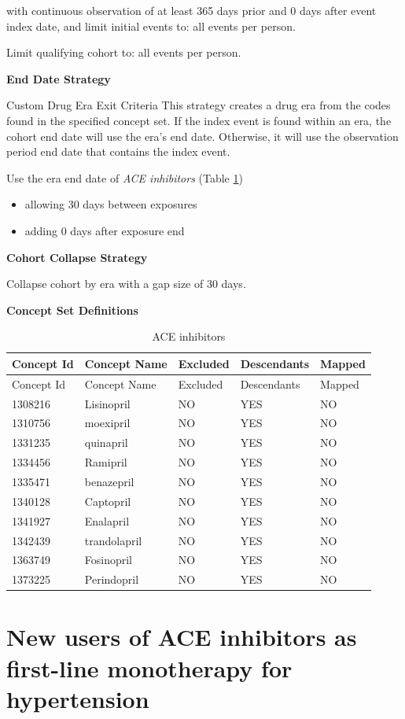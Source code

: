 \documentclass[]{book}
\providecommand{\tightlist}{%
  \setlength{\itemsep}{0pt}\setlength{\parskip}{0pt}}
\begin{document}
with continuous observation of at least 365 days prior and 0 days after
event index date, and limit initial events to: all events per person.

Limit qualifying cohort to: all events per person.

\textbf{End Date Strategy}

Custom Drug Era Exit Criteria This strategy creates a drug era from the
codes found in the specified concept set. If the index event is found
within an era, the cohort end date will use the era's end date.
Otherwise, it will use the observation period end date that contains the
index event.

Use the era end date of \emph{ACE inhibitors} (Table
\ref{tab:aceInhibitors})

\begin{itemize}
\tightlist
\item
  allowing 30 days between exposures
\item
  adding 0 days after exposure end
\end{itemize}

\textbf{Cohort Collapse Strategy}

Collapse cohort by era with a gap size of 30 days.

\textbf{Concept Set Definitions}

\begin{longtable}[]{@{}lllll@{}}
\caption{\label{tab:aceInhibitors} ACE inhibitors}\tabularnewline
\toprule
Concept Id & Concept Name & Excluded & Descendants &
Mapped\tabularnewline
\midrule
\endfirsthead
\toprule
Concept Id & Concept Name & Excluded & Descendants &
Mapped\tabularnewline
\midrule
\endhead
1308216 & Lisinopril & NO & YES & NO\tabularnewline
1310756 & moexipril & NO & YES & NO\tabularnewline
1331235 & quinapril & NO & YES & NO\tabularnewline
1334456 & Ramipril & NO & YES & NO\tabularnewline
1335471 & benazepril & NO & YES & NO\tabularnewline
1340128 & Captopril & NO & YES & NO\tabularnewline
1341927 & Enalapril & NO & YES & NO\tabularnewline
1342439 & trandolapril & NO & YES & NO\tabularnewline
1363749 & Fosinopril & NO & YES & NO\tabularnewline
1373225 & Perindopril & NO & YES & NO\tabularnewline
\bottomrule
\end{longtable}

\section{New users of ACE inhibitors as first-line monotherapy for
hypertension}\label{AceInhibitorsMono}
\end{document}
